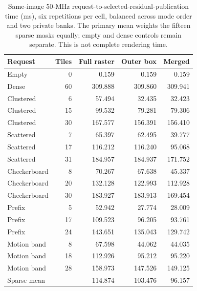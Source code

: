 \begin{table}[!htbp]
\centering\small
\caption{Same-image 50-MHz request-to-selected-residual-publication time (ms),
six repetitions per cell, balanced across mode order and two private banks.
The primary mean weights the fifteen sparse masks equally; empty and dense
controls remain separate. This is not complete rendering time.}
\label{tab:roi-service}
\begin{tabular}{@{}lrrrr@{}}
\toprule
Request & Tiles & Full raster & Outer box & Merged \\
\midrule
Empty & 0 & 0.159 & 0.159 & 0.159 \\
Dense & 60 & 309.888 & 309.860 & 309.941 \\
Clustered & 6 & 57.494 & 32.435 & 32.423 \\
Clustered & 15 & 99.532 & 79.281 & 79.306 \\
Clustered & 30 & 167.577 & 156.391 & 156.410 \\
Scattered & 7 & 65.397 & 62.495 & 39.777 \\
Scattered & 17 & 116.212 & 116.240 & 95.068 \\
Scattered & 31 & 184.957 & 184.937 & 171.752 \\
Checkerboard & 8 & 70.267 & 67.638 & 45.337 \\
Checkerboard & 20 & 132.128 & 122.993 & 112.928 \\
Checkerboard & 30 & 183.927 & 183.913 & 169.454 \\
Prefix & 5 & 52.942 & 27.774 & 28.009 \\
Prefix & 17 & 109.523 & 96.205 & 93.761 \\
Prefix & 24 & 143.651 & 135.043 & 129.742 \\
Motion band & 8 & 67.598 & 44.062 & 44.035 \\
Motion band & 18 & 112.926 & 95.212 & 95.220 \\
Motion band & 28 & 158.973 & 147.526 & 149.125 \\
\midrule
Sparse mean & -- & 114.874 & 103.476 & 96.157 \\
\bottomrule
\end{tabular}
\end{table}
